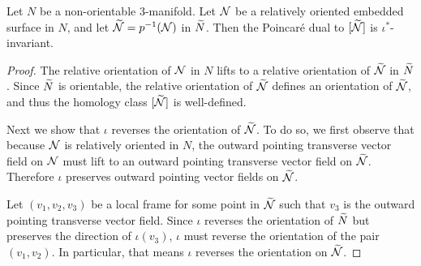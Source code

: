 \begin{lem}
  \label{lem:PD1}
 Let $N$ be a non-orientable 3-manifold.  %
  Let $\mathcal{N}$ be a relatively oriented embedded surface in $N$, and let $\widetilde{\mathcal{N}}=p^{-1}(\mathcal{N})$ in $\widetilde{N}$.
  Then the Poincar\'e dual to $[\widetilde{\mathcal{N}}]$ is $\iota^{\ast}$-invariant.%
\end{lem}
\begin{proof}
  The relative orientation of $\mathcal{N}$ in $N$ lifts to a relative orientation of $\widetilde{\mathcal{N}}$ in $\widetilde{N}$.
  Since $\widetilde{N}$ is orientable, the relative orientation of $\widetilde{\mathcal{N}}$ defines an orientation of $\widetilde{\mathcal{N}}$, and thus the homology class $[\widetilde{\mathcal{N}}]$ is well-defined.

  Next we show that $\iota$ reverses the orientation of $\widetilde{\mathcal{N}}$.  To do so, we first observe that because $\mathcal{N}$ is relatively oriented in $N$, the outward pointing transverse vector field on ${\mathcal{N}}$ must lift to an outward pointing transverse vector field on $\widetilde{\mathcal{N}}$.  Therefore $\iota$ preserves outward pointing vector fields on $\widetilde{\mathcal{N}}$.

  Let $(v_1, v_2, v_3)$ be a local frame for some point in $\widetilde{\mathcal{N}}$ such that
  $v_3$ is the outward pointing transverse vector field.
  Since $\iota$ reverses the orientation of $\widetilde{N}$ but preserves the direction of $\iota(v_3)$, $\iota$ must reverse the orientation of the pair $(v_1, v_2)$.
  In particular, that means $\iota$ reverses the orientation on $\widetilde{\mathcal{N}}$.


\end{proof}
